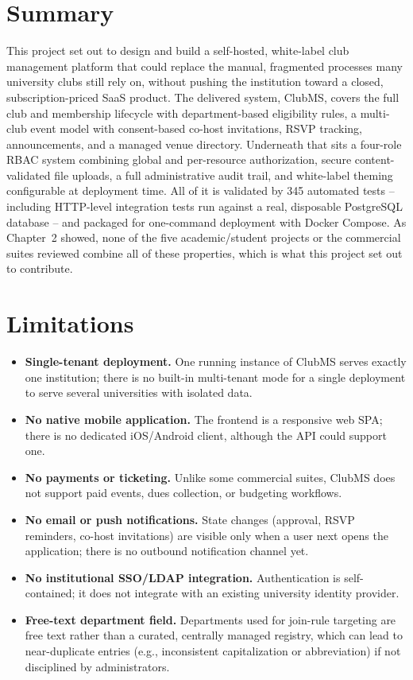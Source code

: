 \documentclass[12pt,oneside]{book}
\begin{document}
\section{Summary}

This project set out to design and build a self-hosted, white-label club management platform that could replace the manual, fragmented processes many university clubs still rely on, without pushing the institution toward a closed, subscription-priced SaaS product. The delivered system, ClubMS, covers the full club and membership lifecycle with department-based eligibility rules, a multi-club event model with consent-based co-host invitations, RSVP tracking, announcements, and a managed venue directory. Underneath that sits a four-role RBAC system combining global and per-resource authorization, secure content-validated file uploads, a full administrative audit trail, and white-label theming configurable at deployment time. All of it is validated by 345 automated tests -- including HTTP-level integration tests run against a real, disposable PostgreSQL database -- and packaged for one-command deployment with Docker Compose. As Chapter~2 showed, none of the five academic/student projects or the commercial suites reviewed combine all of these properties, which is what this project set out to contribute.

\section{Limitations}

\begin{itemize}
\item \textbf{Single-tenant deployment.} One running instance of ClubMS serves exactly one institution; there is no built-in multi-tenant mode for a single deployment to serve several universities with isolated data.
\item \textbf{No native mobile application.} The frontend is a responsive web SPA; there is no dedicated iOS/Android client, although the API could support one.
\item \textbf{No payments or ticketing.} Unlike some commercial suites, ClubMS does not support paid events, dues collection, or budgeting workflows.
\item \textbf{No email or push notifications.} State changes (approval, RSVP reminders, co-host invitations) are visible only when a user next opens the application; there is no outbound notification channel yet.
\item \textbf{No institutional SSO/LDAP integration.} Authentication is self-contained; it does not integrate with an existing university identity provider.
\item \textbf{Free-text department field.} Departments used for join-rule targeting are free text rather than a curated, centrally managed registry, which can lead to near-duplicate entries (e.g., inconsistent capitalization or abbreviation) if not disciplined by administrators.
\end{itemize}
\end{document}
